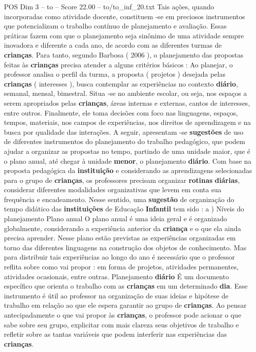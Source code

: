 \begin{textsample}{POS Dim 3 – to – Score 22.00 – to/to\_inf\_20.txt}
Tais ações, quando incorporadas como atividade docente, constituem -se em preciosos instrumentos que potencializam o trabalho contínuo de planejamento e avaliação.
Essas práticas fazem com que o planejamento seja sinônimo de uma atividade sempre inovadora e diferente a cada ano, de acordo com as diferentes turmas de \textbf{crianças}.
Para tanto, segundo Barbosa ( 2006 ), o planejamento das propostas feitas às \textbf{crianças} precisa atender a alguns critérios básicos : Ao planejar, o professor analisa o perfil da turma, a proposta ( projetos ) desejada pelas \textbf{crianças} ( interesses ), busca contemplar as experiências no contexto \textbf{diário}, semanal, mensal, bimestral.
Situa -se no ambiente escolar, ou seja, nos espaços a serem apropriados pelas \textbf{crianças}, áreas internas e externas, cantos de interesses, entre outros.
Finalmente, ele toma decisões com foco nas linguagens, espaços, tempos, materiais, nos campos de experiências, nos direitos de aprendizagem e na busca por qualidade das interações.
A seguir, apresentam -se \textbf{sugestões} de uso de diferentes instrumentos do planejamento do trabalho pedagógico, que podem ajudar a organizar as propostas no tempo, partindo de uma unidade maior, que é o plano anual, até chegar à unidade \textbf{menor}, o planejamento \textbf{diário}.
Com base na proposta pedagógica da \textbf{instituição} e considerando as aprendizagens selecionadas para o grupo de \textbf{crianças}, os professores precisam organizar \textbf{rotinas} \textbf{diárias}, considerar diferentes modalidades organizativas que levem em conta sua frequência e encadeamento.
Nesse sentido, uma \textbf{sugestão} de organização do tempo didático das \textbf{instituições} de Educação \textbf{Infantil} tem sido : a ) Níveis do planejamento Plano anual O plano anual é uma ideia geral e é organizado globalmente, considerando a experiência anterior da \textbf{criança} e o que ela ainda precisa aprender.
Nesse plano estão previstas as experiências organizadas em torno das diferentes linguagens na construção dos objetos de conhecimento.
Mas para distribuir tais experiências ao longo do ano é necessário que o professor reflita sobre como vai propor : em forma de projetos, atividades permanentes, atividades ocasionais, entre outras.
Planejamento \textbf{diário} É um documento específico que orienta o trabalho com as \textbf{crianças} em um determinado \textbf{dia}.
Esse instrumento é útil ao professor na organização de suas ideias e hipótese de trabalho em relação ao que ele espera garantir ao grupo de \textbf{crianças}.
Ao pensar antecipadamente o que vai propor às \textbf{crianças}, o professor pode acionar o que sabe sobre seu grupo, explicitar com mais clareza seus objetivos de trabalho e refletir sobre as tantas variáveis que podem interferir nas experiências das \textbf{crianças}.

\end{textsample}
